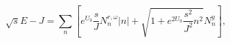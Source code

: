 \begin{equation}
\sqrt{s}E - J = \sum_n \left[ e^{U_0} \frac{s}{J}N_n^{r,\omega}|n| +
\sqrt{1+e^{2U_0}\frac{s^2}{J^2}n^2}N_n^y \right],
\end{equation}

